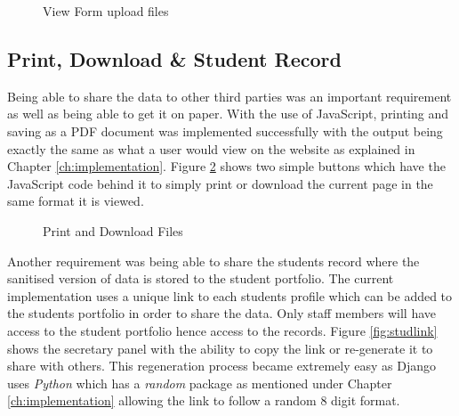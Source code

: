 \documentclass[../main.tex]{subfiles}
\begin{document}
\begin{figure}[H]
        \caption{\label{fig:viewformmorefiles} View Form upload files}
      \end{figure}
      
\subsection*{Print, Download \& Student Record}
Being able to share the data to other third parties was an important requirement as well as being able to get it on paper. With the use of JavaScript, printing and saving as a PDF document was implemented successfully with the output being exactly the same as what a user would view on the website as explained in Chapter \ref{ch:implementation}. Figure \ref{fig:print} shows two simple buttons which have the JavaScript code behind it to simply print or download the current page in the same format it is viewed. 

\begin{figure}[H]
        \caption{\label{fig:print} Print and Download Files}
      \end{figure}
      
Another requirement was being able to share the students record where the sanitised version of data is stored to the student portfolio. The current implementation uses a unique link to each students profile which can be added to the students portfolio in order to share the data. Only staff members will have access to the student portfolio hence access to the records. Figure \ref{fig:studlink} shows the secretary panel with the ability to copy the link or re-generate it to share with others. This regeneration process became extremely easy as Django uses \textit{Python} which has a \textit{random} package as mentioned under Chapter \ref{ch:implementation} allowing the link to follow a random 8 digit format.
\end{document}

